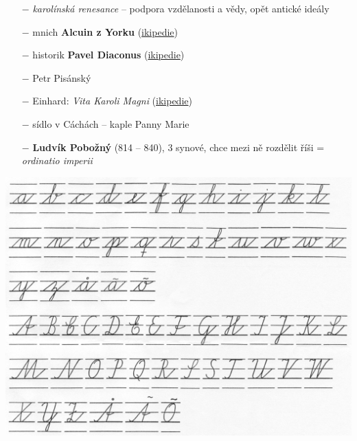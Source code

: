 \documentclass{article}
\begin{document}
\begin{minipage}{0.6\textwidth}\raggedleft
    \begin{itemize}
        \setlength\itemsep{0.15em}
        \item[$-$] \textit{karolínská renesance} -- podpora vzdělanosti a vědy, opět antické ideály
        \item[$-$] mnich \textbf{Alcuin z Yorku} (\href{https://cs.wikipedia.org/wiki/Alcuin}{\faWikipediaW ikipedie})
        \item[$-$] historik \textbf{Pavel Diaconus} (\href{https://cs.wikipedia.org/wiki/Paulus_Diaconus}{\faWikipediaW ikipedie})
        \item[$-$] Petr Pisánský
        \item[$-$] Einhard: \textit{Vita Karoli Magni} (\href{https://cs.wikipedia.org/wiki/Vita_Karoli_Magni}{\faWikipediaW ikipedie})
        \item[$-$] sídlo v Cáchách -- kaple Panny  Marie
        \item[$-$] \textbf{Ludvík Pobožný} (814 -- 840), 3 synové, chce mezi ně rozdělit říši = \textit{ordinatio imperii}
    \end{itemize}
\end{minipage}
\hfill
\noindent\begin{minipage}{0.3\textwidth}
    \includegraphics[width=\linewidth]{miniskule.jpg}
\end{minipage}
\end{document}
